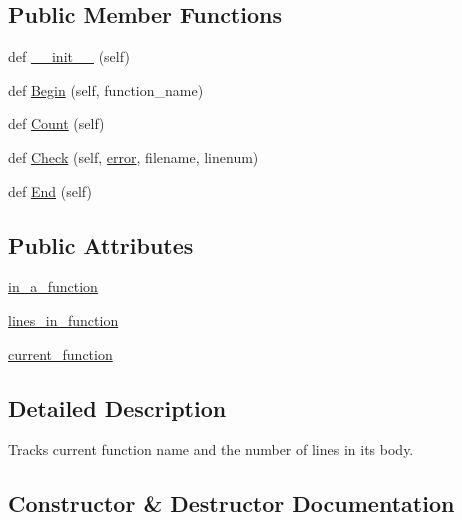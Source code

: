 \subsection*{Public Member Functions}
\begin{DoxyCompactItemize}
\item 
def \hyperlink{classcpplint_1_1___function_state_a3f6a865710852cc74c6a7085180458ae}{\+\_\+\+\_\+init\+\_\+\+\_\+} (self)
\item 
def \hyperlink{classcpplint_1_1___function_state_a41215c4d73baccbb340f6d0df1c1f4b3}{Begin} (self, function\+\_\+name)
\item 
def \hyperlink{classcpplint_1_1___function_state_ac25c9711911ae181b091b52619cf2701}{Count} (self)
\item 
def \hyperlink{classcpplint_1_1___function_state_a5e4ad7d7b104038b45204ab4abf527b2}{Check} (self, \hyperlink{_07copy_08_2_read_camera_model_8m_ac546fdc9911f4a876dbfaffbc7426f8b}{error}, filename, linenum)
\item 
def \hyperlink{classcpplint_1_1___function_state_a1ab6b0a575c25c135f9004b7fb12dc4a}{End} (self)
\end{DoxyCompactItemize}
\subsection*{Public Attributes}
\begin{DoxyCompactItemize}
\item 
\hyperlink{classcpplint_1_1___function_state_a8362d472591f60462184bf68b49c0efb}{in\+\_\+a\+\_\+function}
\item 
\hyperlink{classcpplint_1_1___function_state_a886f5d476adc81f499a711750a399aa2}{lines\+\_\+in\+\_\+function}
\item 
\hyperlink{classcpplint_1_1___function_state_a320674f54bd75087febc8f0d83620569}{current\+\_\+function}
\end{DoxyCompactItemize}


\subsection{Detailed Description}
\begin{DoxyVerb}Tracks current function name and the number of lines in its body.\end{DoxyVerb}
 

\subsection{Constructor \& Destructor Documentation}
